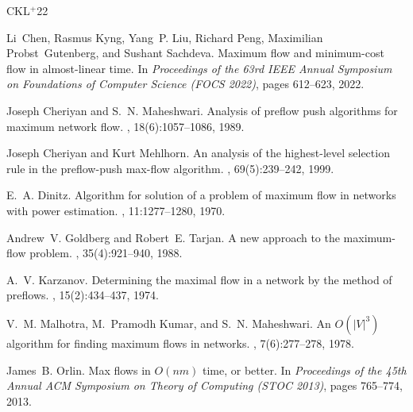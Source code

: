 \documentclass[10pt]{article}
\begin{document}
\newcommand{\etalchar}[1]{$^{#1}$}
\begin{thebibliography}{CKL{\etalchar{+}}22}

\bibitem[CKL{\etalchar{+}}22]{CKLPGS22}
Li~Chen, Rasmus Kyng, Yang~P. Liu, Richard Peng, Maximilian Probst~Gutenberg,
  and Sushant Sachdeva.
\newblock Maximum flow and minimum-cost flow in almost-linear time.
\newblock In {\em Proceedings of the 63rd IEEE Annual Symposium on Foundations
  of Computer Science (FOCS 2022)}, pages 612--623, 2022.

Joseph Cheriyan and S.~N. Maheshwari.
\newblock Analysis of preflow push algorithms for maximum network flow.
, 18(6):1057--1086, 1989.

Joseph Cheriyan and Kurt Mehlhorn.
\newblock An analysis of the highest-level selection rule in the preflow-push
  max-flow algorithm.
, 69(5):239--242, 1999.

E.~A. Dinitz.
\newblock Algorithm for solution of a problem of maximum flow in networks with
  power estimation.
, 11:1277--1280, 1970.

Andrew~V. Goldberg and Robert~E. Tarjan.
\newblock A new approach to the maximum-flow problem.
, 35(4):921--940, 1988.

A.~V. Karzanov.
\newblock Determining the maximal flow in a network by the method of preflows.
, 15(2):434--437, 1974.

V.~M. Malhotra, M.~Pramodh Kumar, and S.~N. Maheshwari.
\newblock An {$O(|V|^3)$} algorithm for finding maximum flows in networks.
, 7(6):277--278, 1978.

James~B. Orlin.
\newblock Max flows in {$O(nm)$} time, or better.
\newblock In {\em Proceedings of the 45th Annual ACM Symposium on Theory of
  Computing (STOC 2013)}, pages 765--774, 2013.

\end{thebibliography}
\end{document}
